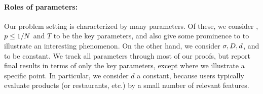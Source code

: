 \paragraph{Roles of parameters:}
Our problem setting is characterized by many parameters.
Of these, we consider \ARMNUM, $p \leq 1/N$ and $T$ to be
the key parameters, and also give some prominence to
\TieDensity to illustrate an interesting phenomenon.
On the other hand, we consider
$\sigma, D, d$, and \TieCutoff to be constant.
We track all parameters through most of our proofs,
but report final results in terms of only the key parameters,
except where we illustrate a specific point.
In particular, we consider $d$ a constant, because users
typically evaluate products (or restaurants, etc.) by a small number of
relevant features.
